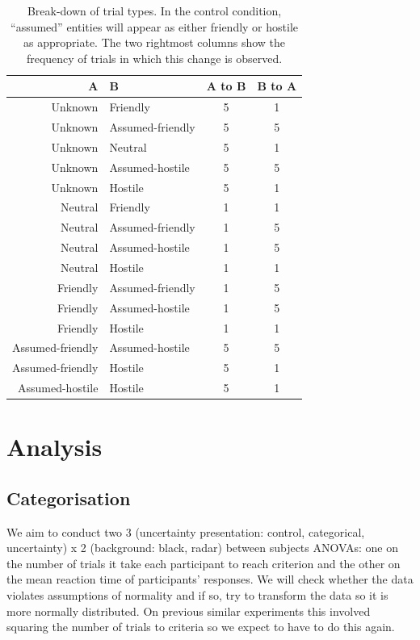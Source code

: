 \documentclass[doc, a4paper, apacite]{apa6}
\begin{document}
\begin{table}[t!]
	\centering
	\caption{Break-down of trial types. In the control condition, ``assumed'' entities will appear as either friendly or hostile as appropriate. The two rightmost columns show the frequency of trials in which this change is observed.} \label{table:trialTypes}
	\begin{tabular}{r l c c}
		\toprule
		A & B & A to B & B to A \\
		\midrule
		Unknown & Friendly & 5 & 1\\
		Unknown & Assumed-friendly & 5 & 5\\
		Unknown & Neutral & 5 & 1 \\
		Unknown & Assumed-hostile & 5 &5\\
		Unknown & Hostile & 5 & 1 \\
		Neutral & Friendly & 1 &1\\
		Neutral & Assumed-friendly &1 &5\\
		Neutral & Assumed-hostile &1 &5\\
		Neutral & Hostile &1 &1\\
		Friendly & Assumed-friendly &1 & 5\\
		Friendly & Assumed-hostile & 1 & 5 \\
		Friendly & Hostile & 1&1\\
		Assumed-friendly & Assumed-hostile & 5 &5\\
		Assumed-friendly & Hostile &5 & 1\\
		Assumed-hostile & Hostile & 5&1\\
		\bottomrule 
	\end{tabular}
\end{table}

\section{Analysis}
\subsection{Categorisation}
We aim to conduct two 3 (uncertainty presentation: control, categorical, uncertainty) x 2 (background: black, radar) between subjects ANOVAs: one on the number of trials it take each participant to reach criterion and the other on the mean reaction time of participants' responses. 
We will check whether the data violates assumptions of normality and if so, try to transform the data so it is more normally distributed.
On previous similar experiments this involved squaring the number of trials to criteria so we expect to have to do this again. 
\end{document}
